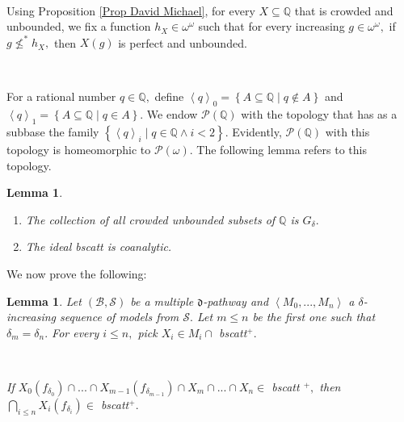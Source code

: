 \documentclass{article}%
\newtheorem{lemma}[theorem]{Lemma}
\begin{document}
\qquad\qquad\ \ \ \ \ \qquad\qquad\ \ \ 

Using Proposition \ref{Prop David Michael}, for every $X\subseteq\mathbb{Q}$
that is crowded and unbounded, we fix a function $h_{X}\in\omega^{\omega}$
such that for every increasing $g\in\omega^{\omega},$ if $g\nleq^{\ast}h_{X},$
then $X\left(  g\right)  $ is perfect and unbounded.

\qquad\qquad\ \ \ 

For a rational number $q\in\mathbb{Q},$ define $\left\langle q\right\rangle
_{0}=\left\{  A\subseteq\mathbb{Q}\mid q\notin A\right\}  $ and $\left\langle
q\right\rangle _{1}=\left\{  A\subseteq\mathbb{Q}\mid q\in A\right\}  .$ We
endow $\mathcal{P}\left(  \mathbb{Q}\right)  $ with the topology that has as a
subbase the family $\left\{  \left\langle q\right\rangle _{i}\mid
q\in\mathbb{Q}\wedge i<2\right\}  .$ Evidently, $\mathcal{P}\left(
\mathbb{Q}\right)  $ with this topology is homeomorphic to $\mathcal{P}\left(
\omega\right)  .$ The following lemma refers to this topology.

\begin{lemma}
\label{Complejidad Gruff}\qquad\ \ \qquad\ \ 

\begin{enumerate}
\item The collection of all crowded unbounded subsets of $\mathbb{Q}$ is
$G_{\delta}.$

\item The ideal \textsf{bscatt }is coanalytic.
\end{enumerate}
\end{lemma}

We now prove the following:

\begin{lemma}
Let $\left(  \mathcal{B},\mathcal{S}\right)  $ be a multiple $\mathfrak{d}%
$-pathway and $\left\langle M_{0},...,M_{n}\right\rangle $ a $\delta
$-increasing sequence of models from $\mathcal{S}.$ Let $m\leq n$ be the first
one such that $\delta_{m}=\delta_{n}.$ For every $i\leq n,$ pick $X_{i}\in
M_{i}\cap$ \textsf{bscatt}$^{+}.$

\qquad\qquad\qquad\ \ \ \qquad\ \ \ \ \qquad\ \ \ \ \ 

If $X_{0}\left(  f_{\delta_{0}}\right)  \cap...\cap X_{m-1}\left(
f_{\delta_{m-1}}\right)  \cap X_{m}\cap...\cap X_{n}\in$ \textsf{bscatt}%
$^{+},$ then $%
{\textstyle\bigcap\limits_{i\leq n}}
X_{i}\left(  f_{\delta_{i}}\right)  \in$ \textsf{bscatt}$^{+}.$
\label{lemma pathway Gruff}
\end{lemma}
\end{document}
